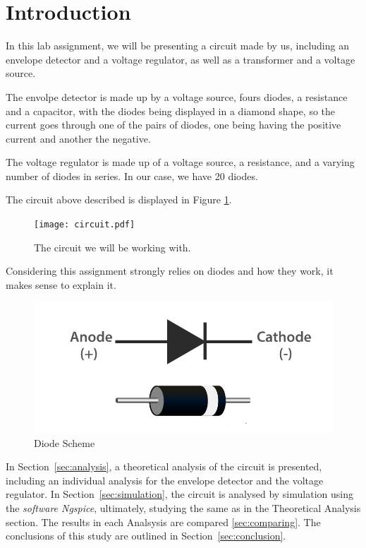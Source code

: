 \newpage
\section{Introduction}
\label{sec:introduction}

In this lab assignment, we will be presenting a circuit made by us, including an envelope detector and a voltage regulator, as well as a transformer and a voltage source.

The envolpe detector is made up by a voltage source, fours diodes, a resistance and a capacitor, with the diodes being displayed in a diamond shape, so the current goes through one of the pairs of diodes, one being having the positive current and another the negative.

The voltage regulator is made up of a voltage source, a resistance, and a varying number of diodes in series. In our case, we have 20 diodes.

The circuit above described is displayed in Figure \ref{fig:circuit}.

\begin{figure}[h] \centering
\texttt{[image: circuit.pdf]}
\caption{The circuit we will be working with.}
\label{fig:circuit}
\end{figure}

Considering this assignment strongly relies on diodes and how they work, it makes sense to explain it.

\begin{figure}[h] \centering
\includegraphics[width=0.6\linewidth]{Diodes-symbol.png}
\caption{Diode Scheme \cite{diode-image}}
\label{fig:diode}
\end{figure}

In Section~\ref{sec:analysis}, a theoretical analysis of the circuit is
presented, including an individual analysis for the envelope detector and the voltage regulator.
In Section~\ref{sec:simulation}, the circuit is analysed by
simulation using the \textit{software Ngspice}, ultimately, studying the same as in the Theoretical Analysis section.
The results in each Analsysis are compared \ref{sec:comparing}.
The conclusions of this study are outlined in
Section~\ref{sec:conclusion}.
